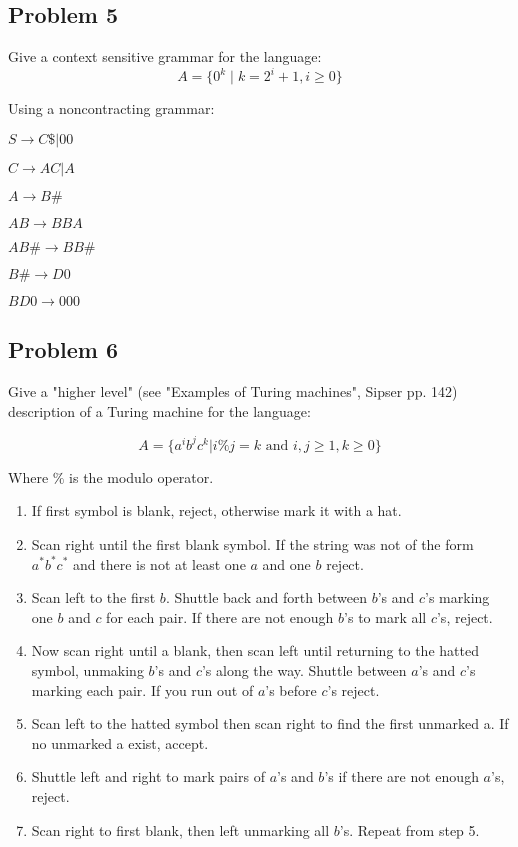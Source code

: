 \documentclass{article}
\begin{document}
    \subsection*{Problem 5}

    Give a context sensitive grammar for the language:
    \[A = \{0^k \;|\; k = 2^i+1,i\ge0\}\]

Using a noncontracting grammar:

    $S \rightarrow C\$ | 00$

    $C \rightarrow AC | A$

    $A \rightarrow B\#$

    $AB \rightarrow BBA$

    $AB\# \rightarrow BB\#$

    $B\# \rightarrow D0$

    $BD0 \rightarrow 000$


    \newpage
    \subsection*{Problem 6}
    Give a "higher level" (see "Examples of Turing machines", Sipser pp. 142) description of a
    Turing machine for the language:

    \[A=\{a^ib^jc^k | i\%j=k \text{ and } i,j\ge1, k \geq 0\}\]

    Where $\%$ is the modulo operator.

    \begin{enumerate}[1)]

    \item If first symbol is blank, reject, otherwise mark it with a hat.

    \item Scan right until the first blank symbol. If the string was not of the form
    $a^*b^*c^*$ and there is not at least one $a$ and one $b$ reject.

    \item Scan left to the first $b$. Shuttle back and forth between $b$'s and 
    $c$'s marking one $b$ and $c$ for each pair. If there are not enough $b$'s
    to mark all $c$'s, reject.

    \item Now scan right until a blank, then scan left until returning to the
    hatted symbol, unmaking $b$'s and $c$'s along the way. Shuttle between $a$'s
    and $c$'s marking each pair. If you run out of $a$'s before $c$'s reject.

    \item Scan left to the hatted symbol then scan right to find the first
    unmarked a. If no unmarked a exist, accept.

    \item Shuttle left and right to mark pairs of $a$'s and $b$'s if there
    are not enough $a$'s, reject.

    \item Scan right to first blank, then left unmarking all $b$'s. Repeat from
    step 5.

    \end{enumerate}

    
\end{document}
